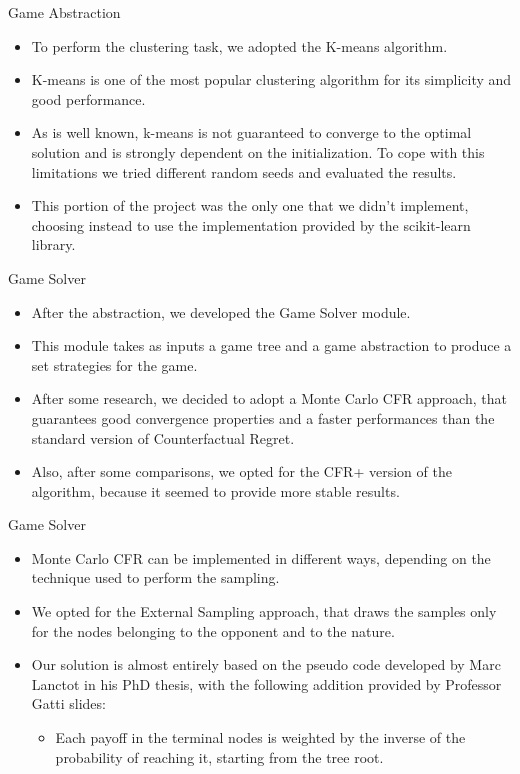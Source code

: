 \documentclass[11pt]{beamer}
\begin{document}
\begin{frame}{Game Abstraction}
\begin{itemize}
\item To perform the clustering task, we adopted the K-means algorithm.
\item K-means is one of the most popular clustering algorithm for its simplicity and good performance.
\item As is well known, k-means is not guaranteed to converge to the optimal solution and is strongly dependent on the initialization. To cope with this limitations we tried different random seeds and evaluated the results. 
\item This portion of the project was the only one that we didn't implement, choosing instead to use the implementation provided by the scikit-learn library.
\end{itemize}
\end{frame}

\begin{frame}{Game Solver}
\begin{itemize}
\item After the abstraction, we developed the Game Solver module.
\item This module takes as inputs a game tree and a game abstraction to produce a set strategies for the game.
\item After some research, we decided to adopt a Monte Carlo CFR approach, that guarantees good convergence properties and a faster performances than the standard version of Counterfactual Regret.
\item Also, after some comparisons, we opted for the CFR+ version of the algorithm, because it seemed to provide more stable results.
\end{itemize}
\end{frame}

\begin{frame}{Game Solver}
\begin{itemize}
\item Monte Carlo CFR can be implemented in different ways, depending on the technique used to perform the sampling.
\item We opted for the External Sampling approach, that draws the samples only for the nodes belonging to the opponent and to the nature.
\item Our solution is almost entirely based on the pseudo code developed by Marc Lanctot in his PhD thesis, with the following addition provided by Professor Gatti slides:
\begin{itemize}
\item Each payoff in the terminal nodes is weighted by the inverse of the probability of reaching it, starting from the tree root.
\end{itemize}
\end{itemize}
\end{frame}
\end{document}
